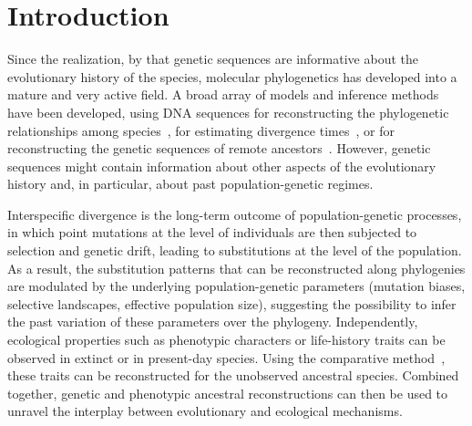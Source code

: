 \documentclass{MBE}
\begin{document}

	\maketitle

	\section{Introduction}
	\label{sec:Introduction}

	Since the realization, by \citet{Zuckerkandl1965} that genetic sequences are informative about the evolutionary history of the species, molecular phylogenetics has developed into a mature and very active field.
	A broad array of models and inference methods have been developed, using {DNA} sequences for reconstructing the phylogenetic relationships among species~\citep{Felsenstein1981}, for estimating divergence times~\citep{Thorne2002}, or for reconstructing the genetic sequences of remote ancestors~\citep{Liberles2007}.
	However, genetic sequences might contain information about other aspects of the evolutionary history and, in particular, about past population-genetic regimes.

	Interspecific divergence is the long-term outcome of population-genetic processes, in which point mutations at the level of individuals are then subjected to selection and {genetic drift}, leading to substitutions at the level of the population.
	As a result, the {substitution} patterns that can be reconstructed along phylogenies are modulated by the underlying population-genetic parameters (mutation biases, selective landscapes, effective population size), suggesting the possibility to infer the past variation of these parameters over the phylogeny.
	Independently, ecological properties such as phenotypic characters or life-history traits can be observed in extinct or in present-day species.
	Using the comparative method~\citep{Felsenstein1985}, these traits can be reconstructed for the unobserved ancestral species.
	Combined together, genetic and phenotypic ancestral reconstructions can then be used to unravel the interplay between evolutionary and ecological mechanisms.
\end{document}
